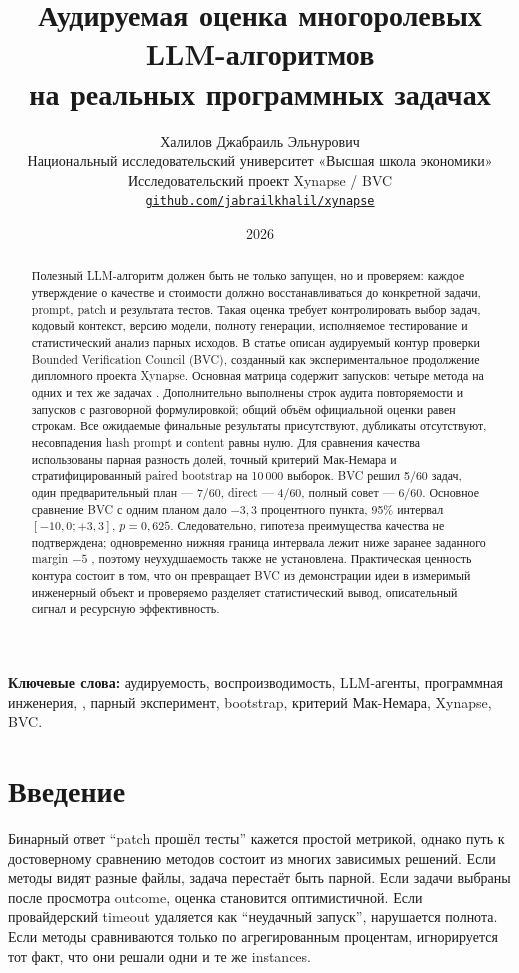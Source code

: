 \documentclass[11pt]{article}
\title{\vspace{-1.2em}\textbf{\sffamily Аудируемая оценка многоролевых LLM-алгоритмов\\
на реальных программных задачах}}
\author{Халилов Джабраиль Эльнурович\\
\small Национальный исследовательский университет «Высшая школа экономики»\\
\small Исследовательский проект Xynapse / BVC\\
\small \href{https://github.com/jabrailkhalil/xynapse}{\nolinkurl{github.com/jabrailkhalil/xynapse}}}
\date{2026}
\begin{document}
\maketitle

\begin{abstract}
Полезный LLM-алгоритм должен быть не только запущен, но и проверяем: каждое
утверждение о качестве и стоимости должно восстанавливаться до конкретной
задачи, prompt, patch и результата тестов. Такая оценка требует контролировать
выбор задач, кодовый контекст, версию модели, полноту генерации, исполняемое
тестирование и статистический анализ парных исходов. В статье описан
аудируемый контур проверки Bounded Verification Council (BVC), созданный
как экспериментальное продолжение дипломного проекта Xynapse. Основная
матрица содержит \NPrimaryRuns{} запусков: четыре метода на одних и тех же
\NTasks{} задачах \dataset{}. Дополнительно выполнены \NRepeatRuns{}
строк аудита повторяемости и \NVibeRuns{} запусков с разговорной
формулировкой; общий объём официальной оценки равен \NAllRuns{} строкам.
Все ожидаемые финальные результаты присутствуют, дубликаты отсутствуют,
несовпадения hash prompt и content равны нулю. Для сравнения качества
использованы парная разность долей, точный критерий Мак-Немара и
стратифицированный paired bootstrap на 10\,000 выборок. BVC решил 5/60
задач, один предварительный план --- 7/60, direct --- 4/60, полный совет
--- 6/60. Основное сравнение BVC с одним планом дало \(-3{,}3\)
процентного пункта, 95\% интервал \([-10{,}0;+3{,}3]\), \(p=0{,}625\).
Следовательно, гипотеза преимущества качества не подтверждена; одновременно
нижняя граница интервала лежит ниже заранее заданного margin \(-5\) \pp,
поэтому неухудшаемость также не установлена. Практическая ценность контура
состоит в том, что он превращает BVC из демонстрации идеи в измеримый
инженерный объект и проверяемо разделяет статистический вывод, описательный
сигнал и ресурсную эффективность.
\end{abstract}

\noindent\textbf{Ключевые слова:} аудируемость, воспроизводимость, LLM-агенты,
программная инженерия, \dataset{}, парный эксперимент, bootstrap,
критерий Мак-Немара, Xynapse, BVC.

\section{Введение}

Бинарный ответ \enquote{patch прошёл тесты} кажется простой метрикой, однако
путь к достоверному сравнению методов состоит из многих зависимых решений.
Если методы видят разные файлы, задача перестаёт быть парной. Если задачи
выбраны после просмотра outcome, оценка становится оптимистичной. Если
провайдерский timeout удаляется как \enquote{неудачный запуск}, нарушается
полнота. Если методы сравниваются только по агрегированным процентам,
игнорируется тот факт, что они решали одни и те же instances.
\end{document}
